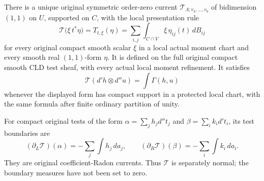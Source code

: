 \begin{theorem}
There is a unique original symmetric order-zero current
\(\mathcal T_{\Lambda;v_3,\ldots,v_b}\) of bidimension \((1,1)\)
on \(U\), supported on \(C\), with the local presentation rule
\[
 \mathcal T\bigl(\xi\,t^*\eta\bigr)
                         =T_{t,\xi}(\eta)
                         =\sum_{i,j}\int_{C\cap V}
                                                \xi\,\eta_{ij}(t)\,dB_{ij}
 \tag{NC8}
\]
for every original compact smooth scalar \(\xi\) in a local
actual moment chart and every smooth real \((1,1)\)-form \(\eta\).
It is defined on the full original compact smooth CLD test sheaf,
with every actual local moment refinement.  It satisfies
\[
       \mathcal T(d'h\otimes d''u)=\int\Gamma(h,u)
 \tag{NC9}
\]
whenever the displayed form has compact support in a protected local
chart, with the same formula after finite ordinary partition of unity.

For compact original tests of the form
\(\alpha=\sum_j h_jd''t_j\) and
\(\beta=\sum_i k_i d't_i\), its test boundaries are
\[
          (\partial_L\mathcal T)(\alpha)=-\sum_j\int h_j\,da_j,
          \qquad
          (\partial_R\mathcal T)(\beta)=-\sum_i\int k_i\,da_i.
 \tag{NC10}
\]
They are original coefficient-Radon currents.  Thus \(\mathcal T\)
is separately normal; the boundary measures have not been set to zero.
\end{theorem}

